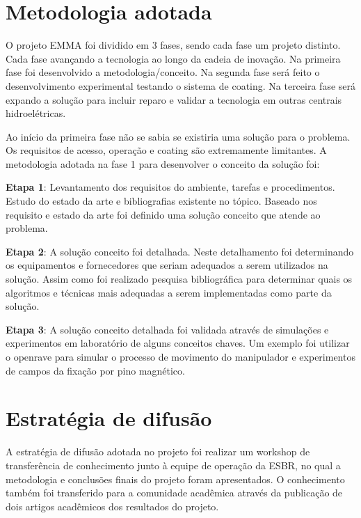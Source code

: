 \section{Metodologia adotada}

O projeto EMMA foi dividido em 3 fases, sendo cada fase um projeto distinto.
Cada fase avançando a tecnologia ao longo da cadeia de inovação. Na primeira
fase foi desenvolvido a metodologia/conceito. Na segunda fase será feito o
desenvolvimento experimental testando o sistema de coating. Na terceira fase
será expando a solução para incluir reparo e validar a tecnologia em outras
centrais hidroelétricas.

Ao início da primeira fase não se sabia se existiria uma solução para o
problema. Os requisitos de acesso, operação e coating são extremamente
limitantes. A metodologia adotada na fase 1 para desenvolver o conceito da
solução foi:

\textbf{Etapa 1}: Levantamento dos requisitos do ambiente, tarefas e
procedimentos.
Estudo do estado da arte e bibliografias existente no tópico. Baseado nos
requisito e estado da arte foi definido uma solução conceito que atende ao problema.

\textbf{Etapa 2}: A solução conceito foi detalhada. Neste detalhamento foi
determinando os equipamentos e fornecedores que seriam adequados a serem
utilizados na solução. Assim como foi realizado pesquisa bibliográfica para
determinar quais os algoritmos e técnicas mais adequadas a serem implementadas
como parte da solução.

\textbf{Etapa 3}:  A solução conceito detalhada foi validada através de
simulações e experi\-mentos em laboratório de alguns conceitos chaves. Um
exemplo foi utilizar o openrave para simular o processo de movimento do manipulador e
experimentos de campos da fixação por pino magnético.

\section{Estratégia de difusão}

A estratégia de difusão adotada no projeto foi realizar um workshop de
transferência de conhecimento junto à equipe de operação da ESBR, no qual a
metodologia e conclusões finais do projeto foram apresentados. O conhecimento
também foi transferido para a comunidade acadêmica através da publicação de
dois artigos acadêmicos dos resultados do projeto.


